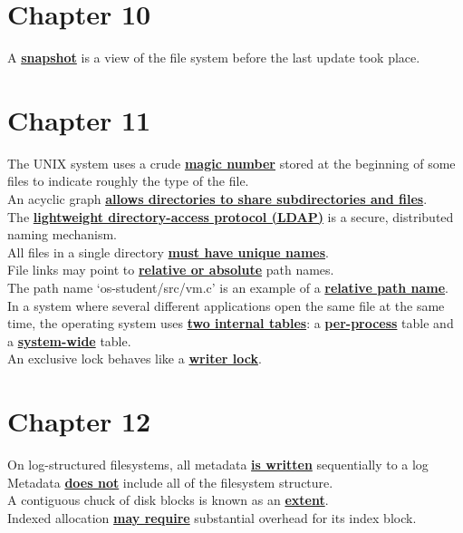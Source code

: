 \documentclass[10pt]{article}
\newcommand{\qw}[1]{\textbf{\ul{#1}}}
\begin{document}
\newpage
\section*{\centering Chapter 10}
A \qw{snapshot} is a view of the file system before the last update took place.\\[2mm]

\newpage
\section*{\centering Chapter 11}
The UNIX system uses a crude \qw{magic number} stored at the beginning of some files to indicate roughly the type of the file.\\[2mm]
An acyclic graph \qw{allows directories to share subdirectories and files}.\\[2mm]
The \qw{lightweight directory-access protocol (LDAP)} is a secure, distributed naming mechanism.\\[2mm]
All files in a single directory \qw{must have unique names}.\\[2mm]
File links may point to \qw{relative or absolute} path names.\\[2mm]
The path name `os-student/src/vm.c' is an example of a \qw{relative path name}.\\[2mm]
In a system where several different applications open the same file at the same time, the operating system uses \qw{two internal tables}: a \qw{per-process} table and a \qw{system-wide} table.\\[2mm]
An exclusive lock behaves like a \qw{writer lock}.\\[2mm]

\newpage
\section*{\centering Chapter 12}
On log-structured filesystems, all metadata \qw{is written} sequentially to a log\\[2mm]
Metadata \qw{does not} include all of the filesystem structure.\\[2mm]
A contiguous chuck of disk blocks is known as an \qw{extent}.\\[2mm]
Indexed allocation \qw{may require} substantial overhead for its index block.\\[2mm]

\newpage
\end{document}
